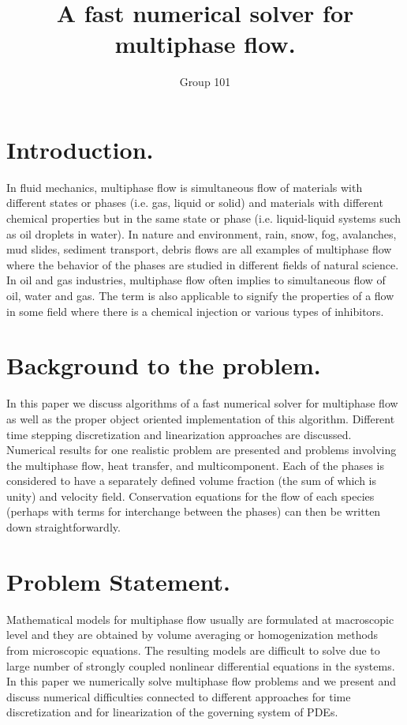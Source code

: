 \documentclass[a4paper,12pt]{article}
\begin{document}
\title{A fast numerical solver for multiphase flow.}
\author{Group 101}
\maketitle
\section{Introduction.}
In fluid mechanics, multiphase flow is simultaneous flow of materials with different states or phases (i.e. gas, liquid or solid) and materials with different chemical properties but in the same state or phase (i.e. liquid-liquid systems such as oil droplets in water).
\newline
\newline
In nature and environment, rain, snow, fog, avalanches, mud slides, sediment transport, debris flows are all examples of multiphase flow where the behavior of the phases are studied in different fields of natural science.
\newline
\newline
In oil and gas industries, multiphase flow often implies to simultaneous flow of oil, water and gas. The term is also applicable to signify the properties of a flow in some field where there is a chemical injection or various types of inhibitors.
\section{Background to the problem.}
In this paper we discuss algorithms of a fast numerical solver for multiphase flow as well as the proper object oriented implementation of this algorithm. Different time stepping discretization and linearization approaches are discussed. 
\newline 
\newline
Numerical results for one realistic problem are presented and problems involving the multiphase flow, heat transfer, and multicomponent.
Each of the phases is considered to have a separately defined volume fraction (the sum of which is unity) and velocity field. Conservation equations for the flow of each species (perhaps with terms for interchange between the phases) can then be written down straightforwardly.
\section{Problem Statement.}
Mathematical models for multiphase flow usually are formulated at macroscopic level and they are obtained by volume averaging or homogenization methods from microscopic equations.
\newline The resulting models are difficult to solve due to large number of strongly coupled nonlinear differential equations in the systems.
\newline
\newline
In this paper we numerically solve multiphase flow problems and we present and discuss numerical difficulties connected to different approaches for time discretization and for linearization of the governing system of PDEs.
\end{document}
